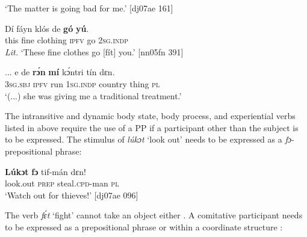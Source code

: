 \glt ‘The matter is going bad for me.’ [dj07ae 161]
\z


\ea%
    \label{ex:key:1086}
    \gll Dí  fáyn    klós    de  \textbf{gó}  \textbf{yú}.\\
this  fine  clothing    \textsc{ipfv}  go  \textsc{2sg.indp}\\

\glt \textit{Lit.} ‘These fine clothes go [fít] you.’ [nn05fn 391]
\z


\ea%
    \label{ex:key:1087}
    \gll \op...\cp{}  e    de  \textbf{rɔ́n}  \textbf{mí}    kɔ́ntri  tín    dɛn.\\
  {} \textsc{3sg.sbj}  \textsc{ipfv}  run  \textsc{1sg.indp}  country  thing  \textsc{pl}\\

\glt ‘(...) she was giving me a traditional treatment.’ 


\z

The intransitive and dynamic body state, body process, and experiential verbs listed in  above require the use of a PP if a participant other than the subject is to be expressed. The stimulus of \textit{lúkɔt} ‘look out’ needs to be expressed as a \textit{fɔ}{}-prepositional phrase: 


\z


\ea%
    \label{ex:key:1089}
    \gll \textbf{Lúkɔt}  \textbf{fɔ} tif-mán      dɛn!\\
look.out  \textsc{prep}  steal\textsc{.cpd}{}-man    \textsc{pl}\\

\glt ‘Watch out for thieves!’ [dj07ae 096]
\z

The verb \textit{fɛ́t} ‘fight’ cannot take an object either . A comitative participant needs to be expressed as a prepositional phrase  or within a coordinate structure :


\z


